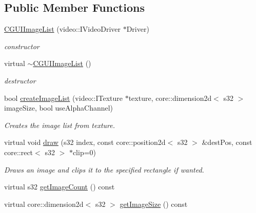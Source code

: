 \subsection*{Public Member Functions}
\begin{DoxyCompactItemize}
\item 
\hypertarget{classirr_1_1gui_1_1_c_g_u_i_image_list_a9ec51c97c0d023b1296ddaeb09ff12b8}{\hyperlink{classirr_1_1gui_1_1_c_g_u_i_image_list_a9ec51c97c0d023b1296ddaeb09ff12b8}{C\-G\-U\-I\-Image\-List} (video\-::\-I\-Video\-Driver $\ast$Driver)}\label{classirr_1_1gui_1_1_c_g_u_i_image_list_a9ec51c97c0d023b1296ddaeb09ff12b8}

\begin{DoxyCompactList}\small\item\em constructor \end{DoxyCompactList}\item 
\hypertarget{classirr_1_1gui_1_1_c_g_u_i_image_list_a63a5828ebbdac332b093ee56049eefa8}{virtual \hyperlink{classirr_1_1gui_1_1_c_g_u_i_image_list_a63a5828ebbdac332b093ee56049eefa8}{$\sim$\-C\-G\-U\-I\-Image\-List} ()}\label{classirr_1_1gui_1_1_c_g_u_i_image_list_a63a5828ebbdac332b093ee56049eefa8}

\begin{DoxyCompactList}\small\item\em destructor \end{DoxyCompactList}\item 
bool \hyperlink{classirr_1_1gui_1_1_c_g_u_i_image_list_a3097e8d63d7f397319689f75435e8580}{create\-Image\-List} (video\-::\-I\-Texture $\ast$texture, core\-::dimension2d$<$ s32 $>$ image\-Size, bool use\-Alpha\-Channel)
\begin{DoxyCompactList}\small\item\em Creates the image list from texture. \end{DoxyCompactList}\item 
virtual void \hyperlink{classirr_1_1gui_1_1_c_g_u_i_image_list_a8fe6b19274588e31640a6a7cf7332aac}{draw} (s32 index, const core\-::position2d$<$ s32 $>$ \&dest\-Pos, const core\-::rect$<$ s32 $>$ $\ast$clip=0)
\begin{DoxyCompactList}\small\item\em Draws an image and clips it to the specified rectangle if wanted. \end{DoxyCompactList}\item 
virtual s32 \hyperlink{classirr_1_1gui_1_1_c_g_u_i_image_list_a186febde541d447689c394aac19011dc}{get\-Image\-Count} () const 
\item 
virtual core\-::dimension2d$<$ s32 $>$ \hyperlink{classirr_1_1gui_1_1_c_g_u_i_image_list_aae82c6dad266868621ad7687a5a0d4a2}{get\-Image\-Size} () const 
\end{DoxyCompactItemize}


